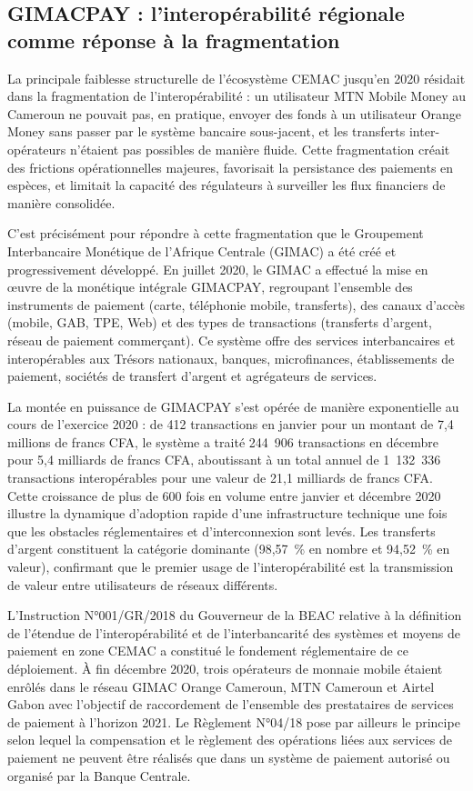 \documentclass[11pt,a4paper,oneside]{report}
\theoremstyle{definition}
\theoremstyle{remark}
\begin{document}
\subsection{GIMACPAY : l'interopérabilité régionale comme réponse à la fragmentation}

La principale faiblesse structurelle de l'écosystème CEMAC jusqu'en 2020 résidait dans la fragmentation de l'interopérabilité : un utilisateur MTN Mobile Money au Cameroun ne pouvait pas, en pratique, envoyer des fonds à un utilisateur Orange Money sans passer par le système bancaire sous-jacent, et les transferts inter-opérateurs n'étaient pas possibles de manière fluide. Cette fragmentation créait des frictions opérationnelles majeures, favorisait la persistance des paiements en espèces, et limitait la capacité des régulateurs à surveiller les flux financiers de manière consolidée.

C'est précisément pour répondre à cette fragmentation que le Groupement Interbancaire Monétique de l'Afrique Centrale (GIMAC) a été créé et progressivement développé. En juillet 2020, le GIMAC a effectué la mise en \oe{}uvre de la monétique intégrale GIMACPAY, regroupant l'ensemble des instruments de paiement (carte, téléphonie mobile, transferts), des canaux d'accès (mobile, GAB, TPE, Web) et des types de transactions (transferts d'argent, réseau de paiement commerçant). Ce système offre des services interbancaires et interopérables aux Trésors nationaux, banques, microfinances, établissements de paiement, sociétés de transfert d'argent et agrégateurs de services.

La montée en puissance de GIMACPAY s'est opérée de manière exponentielle au cours de l'exercice 2020 : de 412 transactions en janvier pour un montant de 7,4 millions de francs CFA, le système a traité 244~906 transactions en décembre pour 5,4 milliards de francs CFA, aboutissant à un total annuel de 1~132~336 transactions interopérables pour une valeur de 21,1 milliards de francs CFA. Cette croissance de plus de 600 fois en volume entre janvier et décembre 2020 illustre la dynamique d'adoption rapide d'une infrastructure technique une fois que les obstacles réglementaires et d'interconnexion sont levés. Les transferts d'argent constituent la catégorie dominante (98,57~\% en nombre et 94,52~\% en valeur), confirmant que le premier usage de l'interopérabilité est la transmission de valeur entre utilisateurs de réseaux différents.

L'Instruction N°001/GR/2018 du Gouverneur de la BEAC relative à la définition de l'étendue de l'interopérabilité et de l'interbancarité des systèmes et moyens de paiement en zone CEMAC a constitué le fondement réglementaire de ce déploiement. À fin décembre 2020, trois opérateurs de monnaie mobile étaient enrôlés dans le réseau GIMAC  Orange Cameroun, MTN Cameroun et Airtel Gabon  avec l'objectif de raccordement de l'ensemble des prestataires de services de paiement à l'horizon 2021. Le Règlement N°04/18 pose par ailleurs le principe selon lequel la compensation et le règlement des opérations liées aux services de paiement ne peuvent être réalisés que dans un système de paiement autorisé ou organisé par la Banque Centrale.
\end{document}
